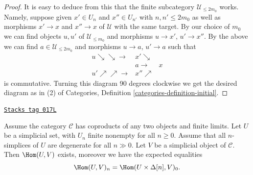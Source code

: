 \begin{proof}
\medskip\noindent
It is easy to deduce from this that the finite subcategory
$\mathcal{U}_{\leq 2m_0}$ works. Namely, suppose given
$x' \in U_n$ and $x'' \in U_{n'}$ with $n, n' \leq 2m_0$ as well as
morphisms $x' \to x$ and $x'' \to x$ of $\mathcal{U}$
with the same target. By our choice of $m_0$ we can
find objects $u, u'$ of $\mathcal{U}_{\leq m_0}$ and
morphisms $u \to x'$, $u' \to x''$.
By the above we can find $a \in \mathcal{U}_{\leq 2m_0}$
and morphisms $u \to a$, $u' \to a$ such that
$$
\begin{array}{ccc}u \searrow\searrow\longrightarrow & x' \searrow &  \\  & a \longrightarrow & x \\ u' \nearrow\nearrow\longrightarrow & x'' \nearrow & \end{array}
$$
is commutative. Turning this diagram 90 degrees clockwise
we get the desired diagram as in (2) of
Categories, Definition \ref{categories-definition-initial}.
\end{proof}

\begin{lemma}
\label{simplicial-lemma-exists-hom-from-simplicial-set-finite}
\href{https://stacks.math.columbia.edu/tag/017L}{\texttt{Stacks tag 017L}}

Assume the category $\mathcal{C}$
has coproducts of any two objects and finite
limits. Let $U$ be a simplicial set, with $U_n$ finite nonempty
for all $n \geq 0$. Assume that all $n$-simplices
of $U$ are degenerate for all $n \gg 0$.
Let $V$ be a simplicial object of $\mathcal{C}$.
Then $\Hom(U, V)$ exists, moreover
we have the expected equalities
$$
\Hom(U, V)_n = \Hom(U \times \Delta[n], V)_0.
$$
\end{lemma}


